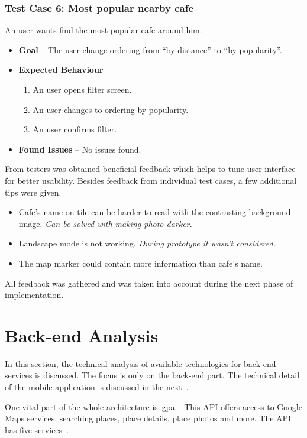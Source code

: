 \subsubsection{Test Case 6: Most popular nearby cafe}
An user wants find the most popular cafe around him. 
\begin{itemize}
    \item \textbf{Goal} -- The user change ordering from ``by distance'' to ``by popularity''.
    \item \textbf{Expected Behaviour}
    \begin{enumerate}
        \item An user opens filter screen.
        \item An user changes to ordering by popularity.
        \item An user confirms filter.
    \end{enumerate}
    \item \textbf{Found Issues} -- No issues found.
\end{itemize}

From testers was obtained beneficial feedback which helps to tune user interface for better usability. Besides feedback from individual test cases, a few additional tips were given.

\begin{itemize}
    \item Cafe's name on tile can be harder to read with the contrasting background image. \textit{Can be solved with making photo darker.}
    \item Landscape mode is not working. \textit{During prototype it wasn't considered.}
    \item The map marker could contain more information than cafe's name.
\end{itemize}

All feedback was gathered and was taken into account during the next phase of implementation.
\section{Back-end Analysis}
In this section, the technical analysis of available technologies for back-end services is discussed. The focus is only on the back-end part. The technical detail of the mobile application is discussed in the next~.

One vital part of the whole architecture is~\gls{gpa}~\cite{google-places-api}. This API offers access to Google Maps services, searching places, place details, place photos and more. The API has five services~\cite{google-places-api}. 

